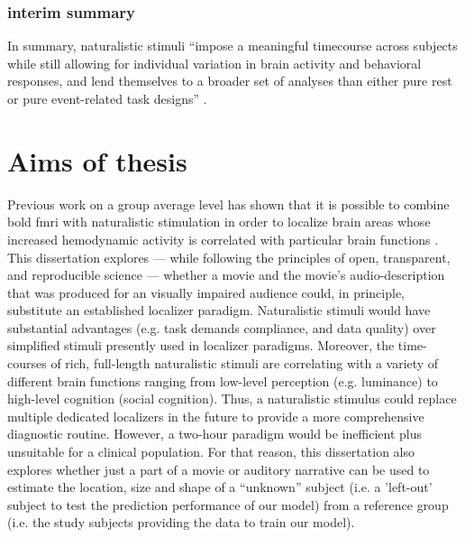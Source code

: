 \subsubsection{interim summary}
In summary, naturalistic stimuli ``impose a meaningful timecourse across
subjects while still allowing for individual variation in brain activity and
behavioral responses, and lend themselves to a broader set of analyses than
either pure rest or pure event-related task designs'' \citep{finn2017can}.



\section{Aims of thesis}

%
Previous work on a group average level has shown that it is possible to combine
\ac{bold} \ac{fmri} with naturalistic stimulation in order to localize brain
areas whose increased hemodynamic activity is correlated with particular brain
functions \citep{bartels2004mapping}.
%
This dissertation explores --- while following the principles of open,
transparent, and reproducible science --- whether a movie and the movie's
audio-description that was produced for an visually impaired audience could, in
principle, substitute an established localizer paradigm.
%
Naturalistic stimuli would have substantial advantages (e.g. task demands
compliance, and data quality) over simplified stimuli presently used in
localizer paradigms.
%
Moreover, the time-courses of rich, full-length naturalistic stimuli are
correlating with a variety of different brain functions ranging from low-level
perception (e.g.  luminance) to high-level cognition (social cognition).
%
Thus, a naturalistic stimulus could replace multiple dedicated localizers in the
future to provide a more comprehensive diagnostic routine.
%
However, a two-hour paradigm would be inefficient plus unsuitable for a clinical
population.
%
For that reason, this dissertation also explores whether just a part of a movie
or auditory narrative can be used to estimate the location, size and shape of a
``unknown'' subject (i.e. a 'left-out' subject to test the prediction
performance of our model) from a reference group (i.e. the study subjects
providing the data to train our model).



